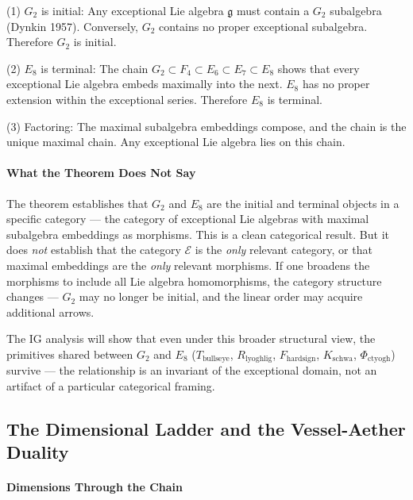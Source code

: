 \documentclass[12pt,a4paper]{article}
\begin{document}
(1) $G_2$ is initial: Any exceptional Lie algebra $\mathfrak{g}$ must contain a $G_2$ subalgebra (Dynkin 1957). Conversely, $G_2$ contains no proper exceptional subalgebra. Therefore $G_2$ is initial.

(2) $E_8$ is terminal: The chain $G_2 \subset F_4 \subset E_6 \subset E_7 \subset E_8$ shows that every exceptional Lie algebra embeds maximally into the next. $E_8$ has no proper extension within the exceptional series. Therefore $E_8$ is terminal.

(3) Factoring: The maximal subalgebra embeddings compose, and the chain is the unique maximal chain. Any exceptional Lie algebra lies on this chain.

\paragraph{What the Theorem Does Not Say}

The theorem establishes that $G_2$ and $E_8$ are the initial and terminal objects in a specific category --- the category of exceptional Lie algebras with maximal subalgebra embeddings as morphisms. This is a clean categorical result. But it does \emph{not} establish that the category $\mathcal{E}$ is the \emph{only} relevant category, or that maximal embeddings are the \emph{only} relevant morphisms. If one broadens the morphisms to include all Lie algebra homomorphisms, the category structure changes --- $G_2$ may no longer be initial, and the linear order may acquire additional arrows.

The IG analysis will show that even under this broader structural view, the primitives shared between $G_2$ and $E_8$ ($T_{\text{bullseye}}$, $R_{\text{lyoghlig}}$, $F_{\text{hardsign}}$, $K_{\text{schwa}}$, $\Phi_{\text{ctyogh}}$) survive --- the relationship is an invariant of the exceptional domain, not an artifact of a particular categorical framing.

\subsection{The Dimensional Ladder and the Vessel-Aether Duality}

\paragraph{Dimensions Through the Chain}
\end{document}
